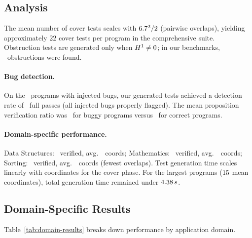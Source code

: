 \documentclass[11pt]{article}
\begin{document}
\subsection{Analysis}
The mean number of cover tests scales with $6.7^2 / 2$ (pairwise
overlaps), yielding approximately $22$ cover tests per program in the
comprehensive suite.  Obstruction tests are generated only when $H^{1}
\neq 0$; in our benchmarks, \compObstructionTotal\ obstructions were found.

\paragraph{Bug detection.}
On the \compBuggyCount\ programs with injected bugs, our generated tests
achieved a detection rate of \compBuggyFullPass\ full passes (all injected
bugs properly flagged).  The mean proposition verification ratio was
\compBuggyMeanPropRatio\ for buggy programs versus
\compCorrectMeanPropRatio\ for correct programs.

\paragraph{Domain-specific performance.}
Data Structures: \expDomainDsVerified\ verified, avg.\ \expDomainDsAvgCoords\
coords; Mathematics: \expDomainMathVerified\ verified, avg.\
\expDomainMathAvgCoords\ coords; Sorting: \expDomainSortVerified\ verified,
avg.\ \expDomainSortAvgCoords\ coords (fewest overlaps).  Test generation
time scales linearly with coordinates for the cover phase.  For the largest
programs ($15$ mean coordinates), total generation time
remained under $4.38\,s$.

\subsection{Domain-Specific Results}

Table~\ref{tab:domain-results} breaks down performance by application domain.
\end{document}
